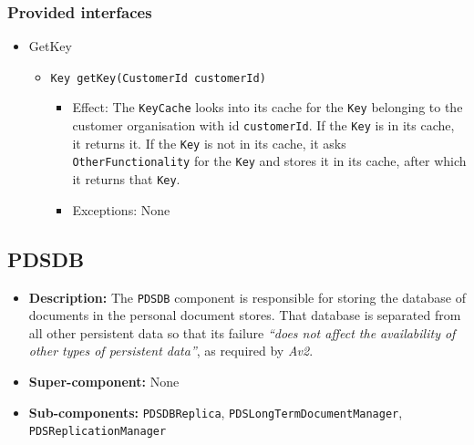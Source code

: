 \documentclass[a4paper,10pt]{article}
\begin{document}
\subsubsection*{Provided interfaces}
\begin{itemize}
    \item GetKey
    \begin{itemize}
        \item \texttt{Key getKey(CustomerId customerId)}
        \begin{itemize}
            \item Effect: The \texttt{KeyCache} looks into its cache for the \texttt{Key} belonging to the customer organisation with id \texttt{customerId}. If the \texttt{Key} is in its cache, it returns it. If the \texttt{Key} is not in its cache, it asks \texttt{OtherFunctionality} for the \texttt{Key} and stores it in its cache, after which it returns that \texttt{Key}.
            \item Exceptions: None
        \end{itemize}
    \end{itemize}
\end{itemize}


\subsection{PDSDB}
\begin{itemize}
    \item \textbf{Description:} The \texttt{PDSDB} component is responsible for storing the database of documents in the personal document stores.  That database is separated from all other persistent data so that its failure \emph{``does not affect the availability of other types of persistent data''}, as required by \emph{Av2}.
    \item \textbf{Super-component:} None
    \item \textbf{Sub-components:} \texttt{PDSDBReplica}, \texttt{PDSLongTermDocumentManager}, \texttt{PDSReplicationManager}
\end{itemize}
\end{document}
